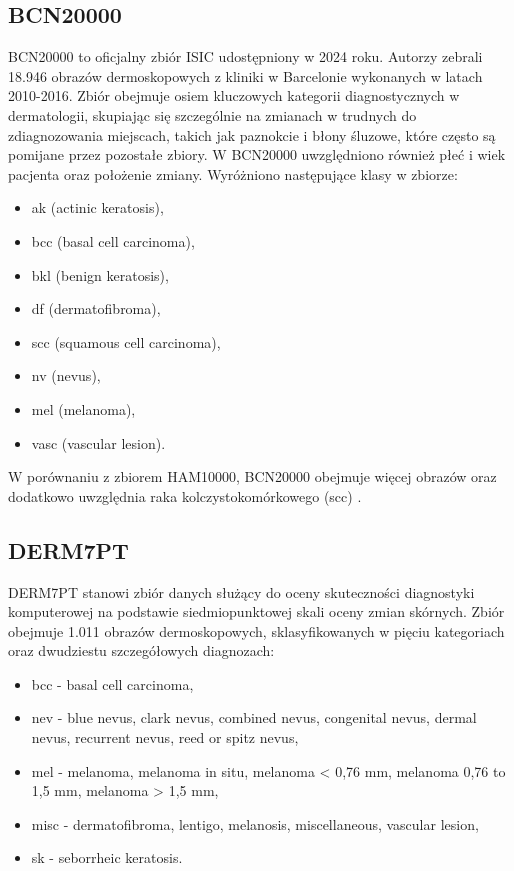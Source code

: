 \subsection{BCN20000}
BCN20000 to oficjalny zbiór ISIC udostępniony w 2024 roku.
Autorzy zebrali 18.946 obrazów dermoskopowych z kliniki w Barcelonie wykonanych w latach 2010-2016.
Zbiór obejmuje osiem kluczowych kategorii diagnostycznych w dermatologii, skupiając się szczególnie na zmianach w trudnych do zdiagnozowania miejscach, takich jak paznokcie i błony śluzowe, które często są pomijane przez pozostałe zbiory.
W BCN20000 uwzględniono również płeć i wiek pacjenta oraz położenie zmiany.
Wyróżniono następujące klasy w zbiorze:
\begin{itemize}
	\item ak (actinic keratosis),
	\item bcc (basal cell carcinoma),
	\item bkl (benign keratosis),
	\item df (dermatofibroma),
	\item scc (squamous cell carcinoma),
	\item nv (nevus),
	\item mel (melanoma),
	\item vasc (vascular lesion).
\end{itemize}

W porównaniu z zbiorem HAM10000, BCN20000 obejmuje więcej obrazów oraz dodatkowo uwzględnia raka kolczystokomórkowego (scc) \cite{Hernández2024}.

\subsection{DERM7PT}
DERM7PT stanowi zbiór danych służący do oceny skuteczności diagnostyki komputerowej na podstawie siedmiopunktowej skali oceny zmian skórnych.
Zbiór obejmuje 1.011 obrazów dermoskopowych, sklasyfikowanych w pięciu kategoriach oraz dwudziestu szczegółowych diagnozach:
\begin{itemize}
	\item bcc - basal cell carcinoma,
	\item nev - blue nevus, clark nevus, combined nevus, congenital nevus, dermal nevus, recurrent nevus, reed or spitz nevus,
	\item mel - melanoma, melanoma in situ, melanoma < 0,76 mm, melanoma 0,76 to 1,5 mm, melanoma > 1,5 mm,
	\item misc - dermatofibroma, lentigo, melanosis, miscellaneous, vascular lesion,
	\item sk - seborrheic keratosis.
\end{itemize}

